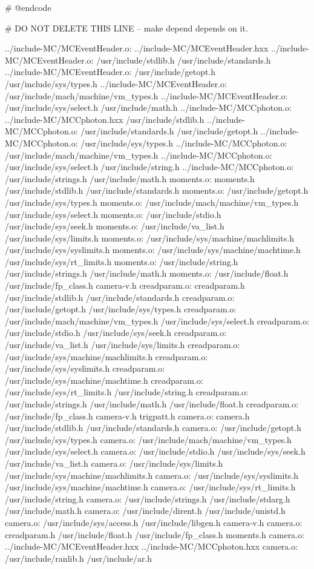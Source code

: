 \documentclass{article}
\begin{document}
# @endcode

# DO NOT DELETE THIS LINE -- make depend depends on it.

../include-MC/MCEventHeader.o: ../include-MC/MCEventHeader.hxx
../include-MC/MCEventHeader.o: /usr/include/stdlib.h /usr/include/standards.h
../include-MC/MCEventHeader.o: /usr/include/getopt.h /usr/include/sys/types.h
../include-MC/MCEventHeader.o: /usr/include/mach/machine/vm\_types.h
../include-MC/MCEventHeader.o: /usr/include/sys/select.h /usr/include/math.h
../include-MC/MCCphoton.o: ../include-MC/MCCphoton.hxx /usr/include/stdlib.h
../include-MC/MCCphoton.o: /usr/include/standards.h /usr/include/getopt.h
../include-MC/MCCphoton.o: /usr/include/sys/types.h
../include-MC/MCCphoton.o: /usr/include/mach/machine/vm\_types.h
../include-MC/MCCphoton.o: /usr/include/sys/select.h /usr/include/string.h
../include-MC/MCCphoton.o: /usr/include/strings.h /usr/include/math.h
moments.o: moments.h /usr/include/stdlib.h /usr/include/standards.h
moments.o: /usr/include/getopt.h /usr/include/sys/types.h
moments.o: /usr/include/mach/machine/vm\_types.h /usr/include/sys/select.h
moments.o: /usr/include/stdio.h /usr/include/sys/seek.h
moments.o: /usr/include/va\_list.h /usr/include/sys/limits.h
moments.o: /usr/include/sys/machine/machlimits.h /usr/include/sys/syslimits.h
moments.o: /usr/include/sys/machine/machtime.h /usr/include/sys/rt\_limits.h
moments.o: /usr/include/string.h /usr/include/strings.h /usr/include/math.h
moments.o: /usr/include/float.h /usr/include/fp\_class.h camera-v.h
creadparam.o: creadparam.h /usr/include/stdlib.h /usr/include/standards.h
creadparam.o: /usr/include/getopt.h /usr/include/sys/types.h
creadparam.o: /usr/include/mach/machine/vm\_types.h /usr/include/sys/select.h
creadparam.o: /usr/include/stdio.h /usr/include/sys/seek.h
creadparam.o: /usr/include/va\_list.h /usr/include/sys/limits.h
creadparam.o: /usr/include/sys/machine/machlimits.h
creadparam.o: /usr/include/sys/syslimits.h
creadparam.o: /usr/include/sys/machine/machtime.h
creadparam.o: /usr/include/sys/rt\_limits.h /usr/include/string.h
creadparam.o: /usr/include/strings.h /usr/include/math.h /usr/include/float.h
creadparam.o: /usr/include/fp\_class.h camera-v.h trigpatt.h
camera.o: camera.h /usr/include/stdlib.h /usr/include/standards.h
camera.o: /usr/include/getopt.h /usr/include/sys/types.h
camera.o: /usr/include/mach/machine/vm\_types.h /usr/include/sys/select.h
camera.o: /usr/include/stdio.h /usr/include/sys/seek.h /usr/include/va\_list.h
camera.o: /usr/include/sys/limits.h /usr/include/sys/machine/machlimits.h
camera.o: /usr/include/sys/syslimits.h /usr/include/sys/machine/machtime.h
camera.o: /usr/include/sys/rt\_limits.h /usr/include/string.h
camera.o: /usr/include/strings.h /usr/include/stdarg.h /usr/include/math.h
camera.o: /usr/include/dirent.h /usr/include/unistd.h
camera.o: /usr/include/sys/access.h /usr/include/libgen.h camera-v.h
camera.o: creadparam.h /usr/include/float.h /usr/include/fp\_class.h moments.h
camera.o: ../include-MC/MCEventHeader.hxx ../include-MC/MCCphoton.hxx
camera.o: /usr/include/ranlib.h /usr/include/ar.h
\end{document}
